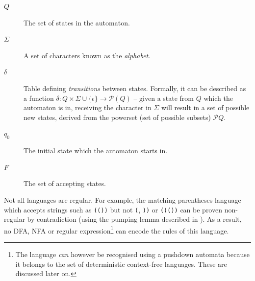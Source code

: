 \documentclass[a4paper,openany,12pt]{book}
\begin{document}
\begin{description}
\item[$Q$] The set of states in the automaton.
\item[$\Sigma$] A set of characters known as the \emph{alphabet}.
\item[$\delta$] Table defining \emph{transitions} between states. Formally, it can be described as a function
                $\delta : Q \times \Sigma \cup \{\epsilon\} \rightarrow \mathcal{P}(Q)$ -- given a state from $Q$ which
                the automaton is in, receiving the character in $\Sigma$ will result in a set of possible new states,
                derived from the powerset (set of possible subsets) $\mathcal{P}Q$.
\item[$q_0$] The initial state which the automaton starts in.
\item[$F$] The set of accepting states.
\end{description}

Not all languages are regular.
For example, the matching parentheses language which accepts strings such as \texttt{(())} but not \texttt{(},
\texttt{))} or \texttt{((())} can be proven non-regular by contradiction (using the pumping lemma described in
\citet{rabin1959finite}).
As a result, no DFA, NFA or regular expression\footnote{The language \emph{can} however be recognised using a pushdown
automata because it belongs to the set of deterministic context-free languages. These are discussed later on.} can encode the rules of this language.
\end{document}

